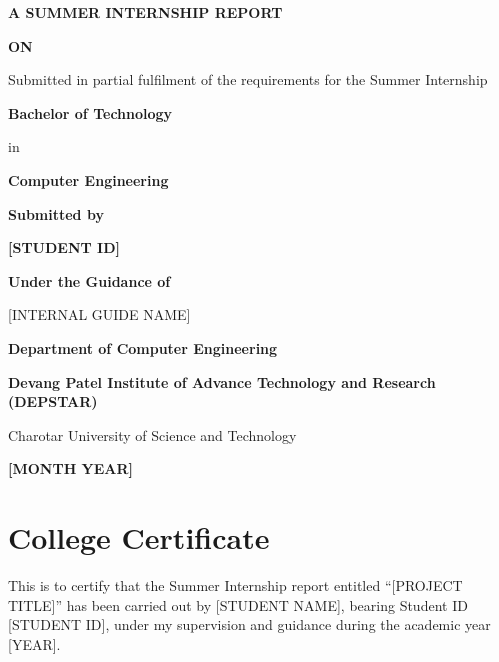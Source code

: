 \documentclass[12pt,a4paper]{report}
\begin{document}
\pagestyle{empty}
\begin{titlepage}
\thispagestyle{empty}
\begin{singlespace}
\centering
\vspace*{0.2in}
{\bfseries\fontsize{16}{19}\selectfont A SUMMER INTERNSHIP REPORT\par}
\vspace{0.14in}
{\bfseries\fontsize{14}{17}\selectfont ON\par}
\vspace{0.14in}
{\bfseries\fontsize{16}{19}\par}
\vspace{0.22in}
Submitted in partial fulfilment of the requirements for the Summer Internship\par
\vspace{0.16in}
{\bfseries Bachelor of Technology\par}
in\par
{\bfseries Computer Engineering\par}
\vspace{0.22in}
{\bfseries Submitted by\par}
{\bfseries\fontsize{14}{17}\par}
{\bfseries [STUDENT ID]\par}
\vspace{0.22in}
{\bfseries Under the Guidance of\par}
[INTERNAL GUIDE NAME]\par
[DESIGNATION]\par
\vspace{0.45in}
{\bfseries\fontsize{14}{17}\selectfont Department of Computer Engineering\par}
{\bfseries\fontsize{13}{16}\selectfont Devang Patel Institute of Advance Technology and Research (DEPSTAR)\par}
Charotar University of Science and Technology\par
\vspace{0.12in}
{\bfseries [MONTH YEAR]\par}
\end{singlespace}
\end{titlepage}

\chapter*{College Certificate}
This is to certify that the Summer Internship report entitled ``[PROJECT TITLE]'' has been carried out by [STUDENT NAME], bearing Student ID [STUDENT ID], under my supervision and guidance during the academic year [YEAR].
\end{document}
